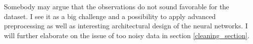 Somebody may argue that the observations do not sound favorable for the dataset. I see it as a big challenge and a possibility to apply advanced preprocessing as well as interesting architectural design of the neural networks. I will further elaborate on the issue of too noisy data in section \ref{cleaning_section}.


\begin{figure*}[h!]
\centering
{}
\end{figure*}
